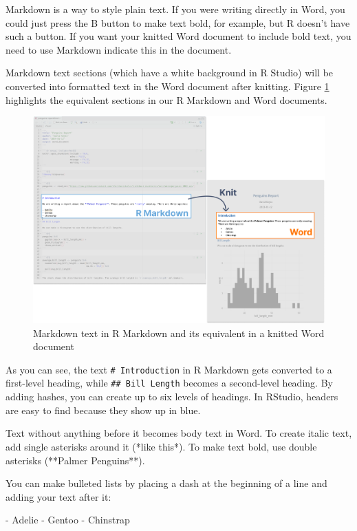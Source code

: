 \documentclass[
]{book}
\newenvironment{Shaded}{\begin{snugshade}}{\end{snugshade}}
\newcommand{\NormalTok}[1]{#1}
\newcommand{\SpecialStringTok}[1]{\textcolor[rgb]{0.31,0.60,0.02}{#1}}
\begin{document}
Markdown is a way to style plain text. If you were writing directly in Word, you could just press the B button to make text bold, for example, but R doesn't have such a button. If you want your knitted Word document to include bold text, you need to use Markdown indicate this in the document.

Markdown text sections (which have a white background in R Studio) will be converted into formatted text in the Word document after knitting. Figure \ref{fig:markdown-text-to-word} highlights the equivalent sections in our R Markdown and Word documents.

\begin{figure}
\includegraphics[width=1\linewidth]{assets/markdown-text-to-word} \caption{Markdown text in R Markdown and its equivalent in a knitted Word document}\label{fig:markdown-text-to-word}
\end{figure}

As you can see, the text \texttt{\#\ Introduction} in R Markdown gets converted to a first-level heading, while \texttt{\#\#\ Bill\ Length} becomes a second-level heading. By adding hashes, you can create up to six levels of headings. In RStudio, headers are easy to find because they show up in blue.

Text without anything before it becomes body text in Word. To create italic text, add single asterisks around it (*like this*). To make text bold, use double asterisks (**Palmer Penguins**).

You can make bulleted lists by placing a dash at the beginning of a line and adding your text after it:

\begin{Shaded}
\begin{Highlighting}[]
\SpecialStringTok{{-} }\NormalTok{Adelie}
\SpecialStringTok{{-} }\NormalTok{Gentoo}
\SpecialStringTok{{-} }\NormalTok{Chinstrap}
\end{Highlighting}
\end{Shaded}
\end{document}
